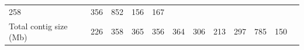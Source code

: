 \documentclass[]{elsarticle} %
\begin{document}
\begin{longtable}[]{@{}llllllllllll@{}}
\begin{minipage}[t]{0.05\columnwidth}
258\strut
\end{minipage} & \begin{minipage}[t]{0.05\columnwidth}\raggedright\strut
356\strut
\end{minipage} & \begin{minipage}[t]{0.05\columnwidth}\raggedright\strut
852\strut
\end{minipage} & \begin{minipage}[t]{0.05\columnwidth}\raggedright\strut
156\strut
\end{minipage} & \begin{minipage}[t]{0.05\columnwidth}\raggedright\strut
167\strut
\end{minipage}\tabularnewline
\begin{minipage}[t]{0.15\columnwidth}\raggedright\strut
Total contig size (Mb)\strut
\end{minipage} & \begin{minipage}[t]{0.05\columnwidth}\raggedright\strut
226\strut
\end{minipage} & \begin{minipage}[t]{0.05\columnwidth}\raggedright\strut
358\strut
\end{minipage} & \begin{minipage}[t]{0.05\columnwidth}\raggedright\strut
365\strut
\end{minipage} & \begin{minipage}[t]{0.05\columnwidth}\raggedright\strut
356\strut
\end{minipage} & \begin{minipage}[t]{0.05\columnwidth}\raggedright\strut
364\strut
\end{minipage} & \begin{minipage}[t]{0.05\columnwidth}\raggedright\strut
306\strut
\end{minipage} & \begin{minipage}[t]{0.05\columnwidth}\raggedright\strut
213\strut
\end{minipage} & \begin{minipage}[t]{0.05\columnwidth}\raggedright\strut
297\strut
\end{minipage} & \begin{minipage}[t]{0.05\columnwidth}\raggedright\strut
785\strut
\end{minipage} & \begin{minipage}[t]{0.05\columnwidth}\raggedright\strut
150\strut
\end{minipage} & \begin{minipage}[t]{0.05\columnwidth}\raggedright\strut

\end{minipage}
\end{longtable}
\end{document}
